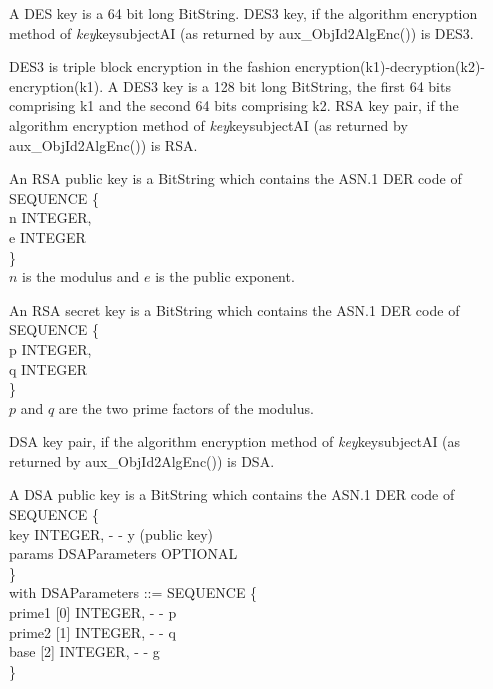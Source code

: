     A DES key is a 64 bit long BitString.
\m  DES3 key, 
    if the algorithm encryption method 
    of {\em key}\pf key\pf subjectAI (as returned by aux\_ObjId2AlgEnc()) is DES3. 

    DES3 is triple block encryption in the fashion encryption(k1)-decryption(k2)-encryption(k1).
    A DES3 key is a 128 bit long BitString, the first 64 bits comprising k1 and the
    second 64 bits comprising k2.
\m  RSA key pair, 
    if the algorithm encryption method 
    of {\em key}\pf key\pf subjectAI (as returned by aux\_ObjId2AlgEnc()) is RSA. 

    An RSA public key is a BitString
    which contains the ASN.1 DER code of
    \bvtab
    \4  SEQUENCE \{ \\
    \4  \2       n INTEGER,   \\
    \4  \2       e INTEGER  \\
    \4  \} \\
    \evtab
    $n$ is the modulus and $e$ is the public exponent.
    

    An RSA secret key is a BitString
    which contains the ASN.1 DER code of
    \bvtab
    \4  SEQUENCE \{ \\
    \4  \2       p INTEGER,   \\
    \4  \2       q INTEGER  \\
    \4  \} \\
    \evtab
    $p$ and $q$ are the two prime factors of the modulus.

\m  DSA key pair, 
    if the algorithm encryption method 
    of {\em key}\pf key\pf subjectAI (as returned by aux\_ObjId2AlgEnc()) is DSA. 

    A DSA public key is a BitString
    which contains the ASN.1 DER code of
    \bvtab
    \4  SEQUENCE \{ \\
    \4  \2       key INTEGER, - - y (public key)   \\
    \4  \2       params DSAParameters OPTIONAL  \\
    \4  \} \\
    \evtab
    with
    \bvtab
    DSAParameters ::= SEQUENCE \{ \\
    \4  \2       prime1 [0] INTEGER, - - p \\
    \4  \2       prime2 [1] INTEGER, - - q \\
    \4  \2       base [2] INTEGER, - - g \\
    \4  \} \\
    \evtab
    
